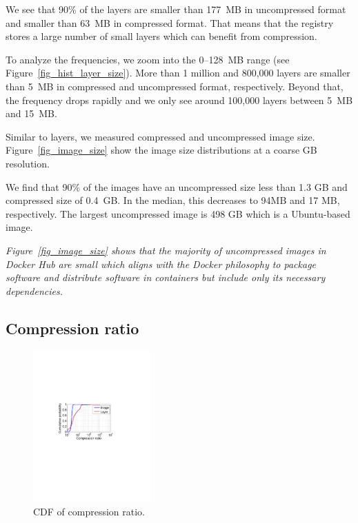 We see that 90\% of the layers are smaller than 177~MB in uncompressed format
and smaller than 63~MB in compressed format.
That means that the registry stores a large number of small layers
which can benefit from compression.

To analyze the frequencies, we zoom into the 0--128~MB range (see
Figure~\ref{fig_hist_layer_size}).
More than 1 million and 800,000 layers are smaller than 5~MB in compressed and
uncompressed format, respectively. Beyond that, the frequency drops rapidly and
we only see around 100,000 layers between 5~MB and 15~MB.

Similar to layers, we measured compressed and uncompressed image size. Figure~\ref{fig_image_size} show the image size distributions at a coarse GB
resolution. 

We find that 90\% of the images have an uncompressed size less than
1.3 GB and compressed size of 0.4~GB.
In the median, this decreases to 94MB and 17 MB, respectively.  The largest
uncompressed image is 498 GB which is a Ubuntu-based image.  

\emph{Figure~\ref{fig_image_size} shows that the majority of uncompressed images in
Docker Hub are small which aligns with the Docker philosophy to package
software and distribute software in containers but include only its necessary
dependencies.}

\subsection{Compression ratio}
\begin{figure}
	\centering
	\includegraphics[width=0.4\textwidth]{graphs/compress-ratio-cdf.pdf}
	\caption{CDF of compression ratio.
	}
	\label{fig:compress-ratio}
\end{figure}

